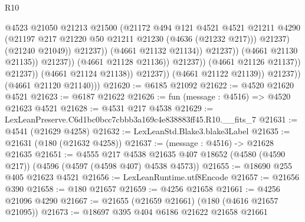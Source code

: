 \begin{lexlean}{R10}
\begin{coremodule}
                                                  @4523
                                                  @21050
                                                  @21213
                                                  @21500
                                                  (@21172
                                                    @494
                                                    @121
                                                    @4521
                                                    @4521
                                                    @21211
                                                    @4290
                                                    (@21197
                                                      @217
                                                      @21220
                                                      @50
                                                      @21211
                                                      @21230
                                                      (@4636 (@21232 @217)))
                                                    @21237)
                                                  (@21240 @21049))
                                                @21237))
                                            (@4661 @21132 @21134))
                                          @21237))
                                      (@4661 @21130 @21135))
                                    @21237))
                                (@4661 @21128 @21136))
                              @21237))
                          (@4661 @21126 @21137))
                        @21237))
                    (@4661 @21124 @21138))
                  @21237))
              (@4661 @21122 @21139))
            @21237))
        (@4661 @21120 @21140)))
@21620 := @6185 @21092
@21622 := @4520 @21620 @4521
@21623 := @6187 @21622
@21626 := fun (message : @4516) => @4520 @21623 @4521
@21628 := @4531 @217 @4538
@21629 := LexLeanPreserve.C6d1bc0bcc7cbbb3a169c4e838883ff45.R10.__fits_7
@21631 := @4541 (@21629 @4258)
@21632 := LexLeanStd.Blake3.blake3Label
@21635 := @21631 (@180 (@21632 @4258))
@21637 := (message : @4516) -> @21628 @21635
@21651 := @4555
    @217
    @4538
    @21635
    @407
    @18652
    (@4580 (@4590 @217))
    (@4596 (@4597 (@4598 @407) @4538 @4573))
@21655 := @18690 @255 @405 @21623 @4521
@21656 := LexLeanRuntime.utf8Encode
@21657 := @21656 @390
@21658 := @180 @21657
@21659 := @4256 @21658
@21661 := @4256 @21096 @4290
@21667 := @21655 (@21659 @21661) (@180 (@4616 @21657 @21095))
@21673 := @18697 @395 @404 @6186 @21622 @21658 @21661

\end{coremodule}
\end{lexlean}
